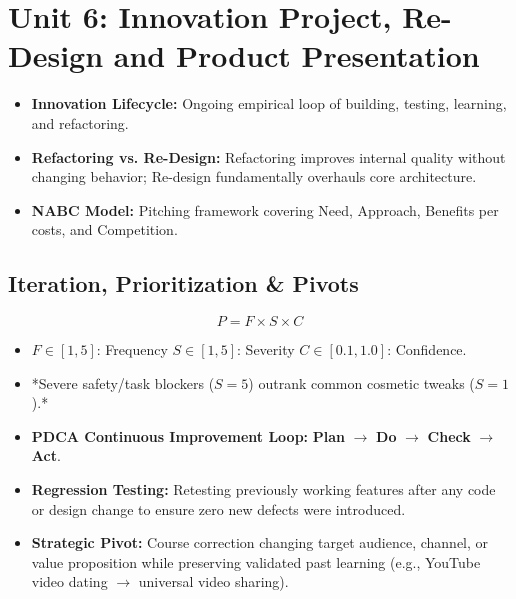 \chapter{Unit 6: Innovation Project, Re-Design and Product Presentation}
\label{chap:unit6_rev}

\begin{revbox}
\begin{itemize}[leftmargin=1.2em, itemsep=2pt]
    \item \textbf{Innovation Lifecycle:} Ongoing empirical loop of building, testing, learning, and refactoring.
    \item \textbf{Refactoring vs. Re-Design:} Refactoring improves internal quality without changing behavior; Re-design fundamentally overhauls core architecture.
    \item \textbf{NABC Model:} Pitching framework covering Need, Approach, Benefits per costs, and Competition.
\end{itemize}
\end{revbox}

\section{Iteration, Prioritization \& Pivots}

\begin{formulabox}
\begin{equation*}
P = F \times S \times C
\end{equation*}
\begin{itemize}[leftmargin=1.2em, itemsep=2pt]
    \item $F \in [1, 5]$: Frequency \quad\textbar\quad $S \in [1, 5]$: Severity \quad\textbar\quad $C \in [0.1, 1.0]$: Confidence.
    \item *Severe safety/task blockers ($S=5$) outrank common cosmetic tweaks ($S=1$).*
    \item \textbf{PDCA Continuous Improvement Loop:} \textbf{Plan} $\rightarrow$ \textbf{Do} $\rightarrow$ \textbf{Check} $\rightarrow$ \textbf{Act}.
\end{itemize}
\end{formulabox}

\begin{itemize}[leftmargin=1.2em, itemsep=3pt]
    \item \textbf{Regression Testing:} Retesting previously working features after any code or design change to ensure zero new defects were introduced.
    \item \textbf{Strategic Pivot:} Course correction changing target audience, channel, or value proposition while preserving validated past learning (e.g., YouTube video dating $\rightarrow$ universal video sharing).
\end{itemize}

